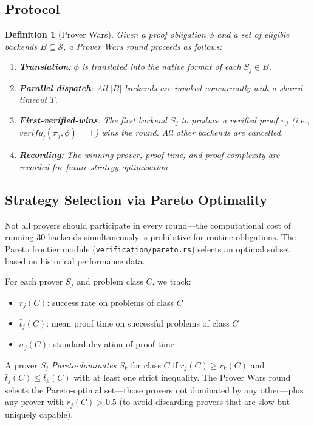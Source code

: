 \documentclass[11pt,a4paper]{article}
\newtheorem{definition}[theorem]{Definition}
\newcommand{\symbolic}{\ensuremath{\mathcal{S}}}
\begin{document}
\subsection{Protocol}

\begin{definition}[Prover Wars]
\label{def:prover-wars}
Given a proof obligation $\phi$ and a set of eligible backends $B \subseteq \symbolic$,
a \emph{Prover Wars} round proceeds as follows:
\begin{enumerate}
  \item \textbf{Translation}: $\phi$ is translated into the native format of
  each $S_j \in B$.
  \item \textbf{Parallel dispatch}: All $|B|$ backends are invoked
  concurrently with a shared timeout $T$.
  \item \textbf{First-verified-wins}: The first backend $S_j$ to produce a
  verified proof $\pi_j$ (i.e., $\mathit{verify}_j(\pi_j, \phi) = \top$)
  wins the round. All other backends are cancelled.
  \item \textbf{Recording}: The winning prover, proof time, and proof
  complexity are recorded for future strategy optimisation.
\end{enumerate}
\end{definition}

\subsection{Strategy Selection via Pareto Optimality}

Not all provers should participate in every round---the computational cost of
running 30 backends simultaneously is prohibitive for routine obligations. The
Pareto frontier module (\texttt{verification/pareto.rs}) selects an optimal
subset based on historical performance data.

For each prover $S_j$ and problem class $C$, we track:
\begin{itemize}
  \item $r_j(C)$: success rate on problems of class $C$
  \item $\bar{t}_j(C)$: mean proof time on successful problems of class $C$
  \item $\sigma_j(C)$: standard deviation of proof time
\end{itemize}

A prover $S_j$ \emph{Pareto-dominates} $S_k$ for class $C$ if
$r_j(C) \geq r_k(C)$ and $\bar{t}_j(C) \leq \bar{t}_k(C)$ with at least one
strict inequality. The Prover Wars round selects the Pareto-optimal set---those
provers not dominated by any other---plus any prover with $r_j(C) > 0.5$
(to avoid discarding provers that are slow but uniquely capable).
\end{document}
